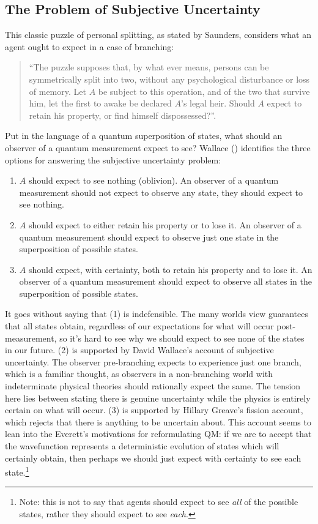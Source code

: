 \documentclass{article}
\begin{document}
\subsection{The Problem of Subjective Uncertainty}\label{SU}
This classic puzzle of personal splitting, as stated by Saunders, considers what an agent ought to expect in a case of branching:  
\begin{quote}
	``The puzzle supposes that, by what ever means, persons can be symmetrically split into two, without any psychological disturbance or loss of memory. Let $A$ be subject to this operation, and of the two that survive him, let the first to awake be declared $A$'s legal heir. Should $A$ expect to retain his property, or find himself dispossessed?''\parencite[386]{saundersTimeQuantumMechanics1998}.
\end{quote}
Put in the language of a quantum superposition of states, what should an observer of a quantum measurement expect to see?
Wallace (\citeyear{wallaceEpistemologyQuantizedCircumstances2006}) identifies the three options for answering the subjective uncertainty problem:
\begin{enumerate}[label={(\arabic*)}]
	\item $A$ should expect to see nothing (oblivion). An observer of a quantum measurement should not expect to observe any state, they should expect to see nothing.
	\item $A$ should expect to either retain his property or to lose it. An observer of a quantum measurement should expect to observe just one state in the superposition of possible states.
	\item $A$ should expect, with certainty, both to retain his property and to lose it. An observer of a quantum measurement should expect to observe all states in the superposition of possible states.
\end{enumerate}
It goes without saying that (1) is indefensible.
The many worlds view guarantees that all states obtain, regardless of our expectations for what will occur post-measurement, so it's hard to see why we should expect to see none of the states in our future. 
(2) is supported by David Wallace's account of subjective uncertainty. The observer pre-branching expects to experience just one branch, which is a familiar thought, as observers in a non-branching world with indeterminate physical theories should rationally expect the same. The tension here lies between stating there is genuine uncertainty while the physics is entirely certain on what will occur. 
(3) is supported by Hillary Greave's fission account, which rejects that there is anything to be uncertain about. This account seems to lean into the Everett's motivations for reformulating QM: if we are to accept that the wavefunction represents a deterministic evolution of states which will certainly obtain, then perhaps we should just expect with certainty to see each state.\footnote{Note: this is not to say that agents should expect to see \emph{all} of the possible states, rather they should expect to see \emph{each}.}
\end{document}
